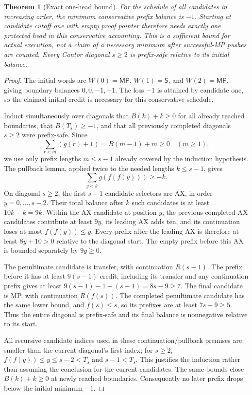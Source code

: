 \documentclass[11pt]{article}
\newtheorem{theorem}{Theorem}[section]
\newcommand{\MP}{\mathsf{MP}}
\newcommand{\SSS}{\mathsf S}
\begin{document}
\begin{theorem}[Exact one-head bound]
For the schedule of all candidates in increasing order, the minimum conservative prefix balance is $-1$. Starting at candidate cutoff one with empty proof pointer therefore needs exactly one protected head in this conservative accounting. This is a sufficient bound for actual execution, not a claim of a necessary minimum after successful-MP pushes are counted. Every Cantor diagonal $s\ge2$ is prefix-safe relative to its initial balance.
\end{theorem}
\begin{proof}
The initial words are $W(0)=\MP$, $W(1)=\SSS$, and $W(2)=\MP$, giving boundary balances $0,0,-1,-1$. The loss $-1$ is attained by candidate one, so the claimed initial credit is necessary for this conservative schedule.

Induct simultaneously over diagonals that $B(k)+k\ge0$ for all already reached boundaries, that $B(T_s)\ge-1$, and that all previously completed diagonals $s\ge2$ were prefix-safe. Since
\[
 \sum_{r<m}(g(r)+1)=B(m-1)+m\ge0\quad(m\ge1),
\]
we use only prefix lengths $m\le s-1$ already covered by the induction hypothesis. The pullback lemma, applied twice to the needed lengths $k\le s-1$, gives
\[
 \sum_{y<k}g(f(f(y)))\ge-k.
\]
On diagonal $s\ge2$, the first $s-1$ candidate selectors are AX, in order $y=0,\ldots,s-2$. Their total balance after $k$ such candidates is at least $10k-k=9k$. Within the AX candidate at position $y$, the previous completed AX candidates contribute at least $9y$, its leading AX adds ten, and its continuation loses at most $f(f(y))\le y$. Every prefix after the leading AX is therefore at least $8y+10>0$ relative to the diagonal start. The empty prefix before this AX is bounded separately by $9y\ge0$.

The penultimate candidate is transfer, with continuation $R(s-1)$. The prefix before it has at least $9(s-1)$ credit; including its transfer and any continuation prefix gives at least
$9(s-1)-1-(s-1)=8s-9\ge7$.
The final candidate is MP, with continuation $R(f(s))$. The completed penultimate candidate has the same lower bound, and $f(s)\le s$, so its prefixes are at least $7s-9\ge5$. Thus the entire diagonal is prefix-safe and its final balance is nonnegative relative to its start.

All recursive candidate indices used in these continuation/pullback premises are smaller than the current diagonal's first index; for $s\ge2$, $f(f(y))\le y\le s-2<T_s$ and $s-1<T_s$. This justifies the induction rather than assuming the conclusion for the current candidates. The same bounds close $B(k)+k\ge0$ at newly reached boundaries. Consequently no later prefix drops below the initial minimum $-1$.
\end{proof}
\end{document}
